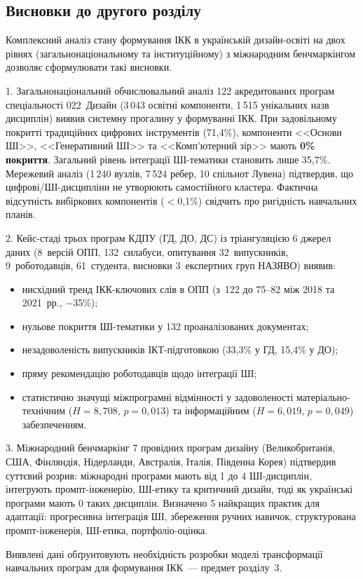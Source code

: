 \subsection*{Висновки до другого розділу}

Комплексний аналіз стану формування ІКК в українській дизайн-освіті на двох рівнях (загальнонаціональному та інституційному) з міжнародним бенчмаркінгом дозволяє сформулювати такі висновки.

1. Загальнонаціональний обчислювальний аналіз 122 акредитованих програм спеціальності 022~Дизайн (3\,043 освітні компоненти, 1\,515 унікальних назв дисциплін) виявив системну прогалину у формуванні ІКК. При задовільному покритті традиційних цифрових інструментів (71,4\%), компоненти <<Основи ШІ>>, <<Генеративний ШІ>> та <<Комп'ютерний зір>> мають \textbf{0\% покриття}. Загальний рівень інтеграції ШІ-тематики становить лише 35,7\%. Мережевий аналіз (1\,240 вузлів, 7\,524 ребер, 10 спільнот Лувена) підтвердив, що цифрові/ШІ-дисципліни не утворюють самостійного кластера. Фактична відсутність вибіркових компонентів ($<$0,1\%) свідчить про ригідність навчальних планів.

2. Кейс-стаді трьох програм КДПУ (ГД, ДО, ДС) із тріангуляцією 6 джерел даних (8~версій ОПП, 132~силабуси, опитування 32~випускників, 9~роботодавців, 61~студента, висновки 3~експертних груп НАЗЯВО) виявив:
\begin{itemize}
    \item нисхідний тренд ІКК-ключових слів в ОПП (з~122 до 75--82 між 2018 та 2021~рр., $-$35\%);
    \item нульове покриття ШІ-тематики у 132 проаналізованих документах;
    \item незадоволеність випускників ІКТ-підготовкою (33,3\% у ГД, 15,4\% у ДО);
    \item пряму рекомендацію роботодавців щодо інтеграції ШІ;
    \item статистично значущі міжпрограмні відмінності у задоволеності матеріально-технічним ($H = 8{,}708$, $p = 0{,}013$) та інформаційним ($H = 6{,}019$, $p = 0{,}049$) забезпеченням.
\end{itemize}

3. Міжнародний бенчмаркінг 7 провідних програм дизайну (Великобританія, США, Фінляндія, Нідерланди, Австралія, Італія, Південна Корея) підтвердив суттєвий розрив: міжнародні програми мають від 1 до 4 ШІ-дисциплін, інтегрують промпт-інженерію, ШІ-етику та критичний дизайн, тоді як українські програми мають 0 таких дисциплін. Визначено 5 найкращих практик для адаптації: прогресивна інтеграція ШІ, збереження ручних навичок, структурована промпт-інженерія, ШІ-етика, портфоліо-оцінка.

Виявлені дані обґрунтовують необхідність розробки моделі трансформації навчальних програм для формування ІКК~--- предмет розділу~3.
